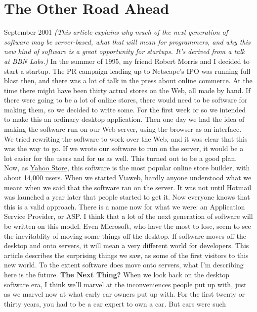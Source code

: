 \chapter{The Other Road Ahead}

September 2001
\emph{
(This article explains why much of the next generation of software
may be server-based, what that will mean for programmers,
and why this new kind of software is a great opportunity for startups.
It's derived from a talk at BBN Labs.)
}
In the summer of 1995, my friend Robert Morris and I decided to
start a startup.  The PR campaign leading up to Netscape's IPO was
running full blast then, and there was a lot of talk in the press
about online commerce.  At the time there might have been thirty
actual stores on the Web, all made by hand.  If there were going
to be a lot of online stores, there would need to be software for making
them, so we decided to write some.
For the first week or so we intended to make this an ordinary   
desktop application.  Then one day we had the idea of making the
software run on our Web server, using the browser as an
interface.  We tried rewriting the software to work over
the Web, and it was clear that this was the way to go.
If we wrote our software to run on the server, it would be a lot easier
for the users and for us as well.
This turned out to be a good plan.  Now, as 
\href{http://store.yahoo.com}{Yahoo Store}, this
software is the most popular online store builder, with
about 14,000 users.
When we started Viaweb, hardly anyone understood what we meant when
we said that the software ran on the server.  It was not until
Hotmail was launched a year later that people started to get it.
Now everyone knows that this is a valid approach.  There is
a name now for what we were: an Application Service Provider,
or ASP.
I think that a lot of the next generation of software will be
written on this model.  Even Microsoft, who have the most to
lose, seem to see the inevitablity of moving some things off
the desktop. If software moves
off the desktop and onto servers, it will mean a very different
world for developers.  This article describes the surprising
things we saw, as some of the first visitors to this new world.
To the extent software does move onto
servers, what I'm describing here is the future.
\textbf{The Next Thing?}
When we look back on the desktop software era, I think we'll marvel
at the inconveniences people put up with, just as we marvel now at
what early car owners put up with.  For the first twenty or thirty
years, you had to be a car expert to own a car.  But cars were such
